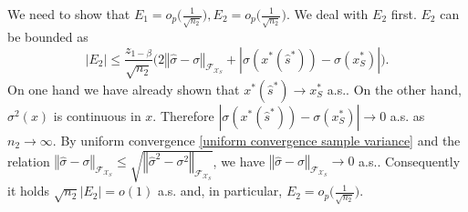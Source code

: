 \documentclass[mnsc,blindrev]{informs4} %
\newcommand{\norm}[1]{\left \Vert #1 \right\Vert}
\newcommand{\abs}[1]{\left \vert #1 \right\vert}
\begin{document}
We need to show that $E_1=o_p\big(\frac{1}{\sqrt{n_2}}\big),E_2=o_p\big(\frac{1}{\sqrt{n_2}}\big)$. We deal with $E_2$ first. $E_2$ can be bounded as
\begin{equation*}
\abs{E_2}\leq \frac{z_{1-\beta}}{\sqrt{n_2}}\big(2\norm{\hat{\sigma}-\sigma}_{\mathcal F_{\mathcal X_S}}+\abs{\sigma(x^*(\hat s^*))-\sigma(x_S^*)}\big).
\end{equation*}
On one hand we have already shown that $x^*(\hat s^*)\to x_S^*$ a.s.. On the other hand, $\sigma^2(x)$ is continuous in $x$. Therefore $\abs{\sigma(x^*(\hat s^*))-\sigma(x_S^*)}\to 0$ a.s. as $n_2\to\infty$. By uniform convergence \eqref{uniform convergence sample variance} and the relation $\norm{\hat{\sigma}-\sigma}_{\mathcal F_{\mathcal X_S}}\leq\sqrt{\norm{\hat{\sigma}^2-\sigma^2}_{\mathcal F_{\mathcal X_S}}}$, we have $\norm{\hat{\sigma}-\sigma}_{\mathcal F_{\mathcal X_S}}\to 0$ a.s.. Consequently it holds $\sqrt{n_2}\abs{E_2}=o(1)$ a.s. and, in particular, $E_2=o_p\big(\frac{1}{\sqrt{n_2}}\big)$.
\end{document}
